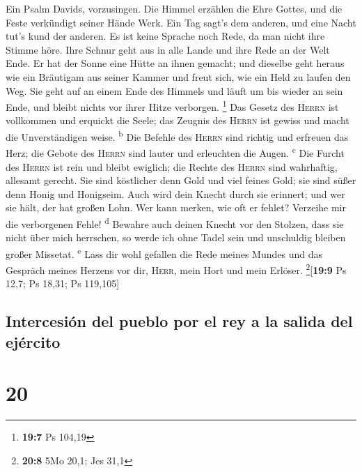  Ein Psalm Davids, vorzusingen.  Die Himmel
erzählen die Ehre Gottes, und die Feste verkündigt seiner Hände Werk.
 Ein Tag sagt's dem anderen, und eine Nacht tut's kund der
anderen.  Es ist keine Sprache noch Rede, da man nicht
ihre Stimme höre.  Ihre Schnur geht aus in alle Lande und
ihre Rede an der Welt Ende. Er hat der Sonne eine Hütte an ihnen
gemacht;  und dieselbe geht heraus wie ein Bräutigam aus
seiner Kammer und freut sich, wie ein Held zu laufen den Weg.
 Sie geht auf an einem Ende des Himmels und läuft um bis
wieder an sein Ende, und bleibt nichts vor ihrer Hitze verborgen.
\footnote{\textbf{19:7} Ps 104,19}  Das Gesetz des
\textsc{Herrn} ist vollkommen und erquickt die Seele; das Zeugnis des
\textsc{Herrn} ist gewiss und macht die Unverständigen weise.
\textsuperscript{b}  Die Befehle des \textsc{Herrn} sind
richtig und erfreuen das Herz; die Gebote des \textsc{Herrn} sind lauter
und erleuchten die Augen. \textsuperscript{c}  Die Furcht
des \textsc{Herrn} ist rein und bleibt ewiglich; die Rechte des
\textsc{Herrn} sind wahrhaftig, allesamt gerecht.  Sie
sind köstlicher denn Gold und viel feines Gold; sie sind süßer denn
Honig und Honigseim.  Auch wird dein Knecht durch sie
erinnert; und wer sie hält, der hat großen Lohn.  Wer
kann merken, wie oft er fehlet? Verzeihe mir die verborgenen Fehle!
\textsuperscript{d}  Bewahre auch deinen Knecht vor den
Stolzen, dass sie nicht über mich herrschen, so werde ich ohne Tadel
sein und unschuldig bleiben großer Missetat. \textsuperscript{e}
 Lass dir wohl gefallen die Rede meines Mundes und das
Gespräch meines Herzens vor dir, \textsc{Herr}, mein Hort und mein
Erlöser. \footnote{\textbf{20:8} 5Mo 20,1; Jes 31,1}{[}\textbf{19:9} Ps
12,7; Ps 18,31; Ps 119,105{]}

\hypertarget{intercesiuxf3n-del-pueblo-por-el-rey-a-la-salida-del-ejuxe9rcito}{%
\subsection{Intercesión del pueblo por el rey a la salida del
ejército}\label{intercesiuxf3n-del-pueblo-por-el-rey-a-la-salida-del-ejuxe9rcito}}

\hypertarget{section-19}{%
\section{20}\label{section-19}}

